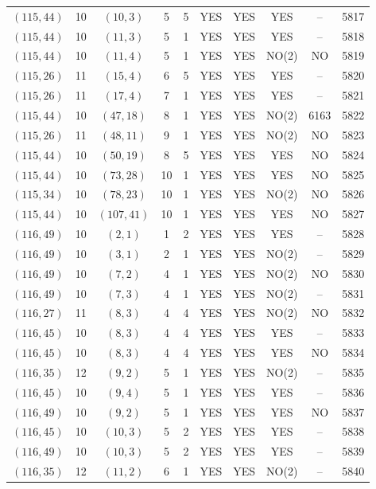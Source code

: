 \begin{longtable}{|c|c|c|c|c|c|c|c|c|c|}
$(115, 44)$ & 10 & $(10, 3)$ & 5 & 5 & YES & YES & YES & -- & 5817\\
$(115, 44)$ & 10 & $(11, 3)$ & 5 & 1 & YES & YES & YES & -- & 5818\\
$(115, 44)$ & 10 & $(11, 4)$ & 5 & 1 & YES & YES & NO(2) & NO & 5819\\
$(115, 26)$ & 11 & $(15, 4)$ & 6 & 5 & YES & YES & YES & -- & 5820\\
$(115, 26)$ & 11 & $(17, 4)$ & 7 & 1 & YES & YES & YES & -- & 5821\\
$(115, 44)$ & 10 & $(47, 18)$ & 8 & 1 & YES & YES & NO(2) & 6163 & 5822\\
$(115, 26)$ & 11 & $(48, 11)$ & 9 & 1 & YES & YES & NO(2) & NO & 5823\\
$(115, 44)$ & 10 & $(50, 19)$ & 8 & 5 & YES & YES & YES & NO & 5824\\
$(115, 44)$ & 10 & $(73, 28)$ & 10 & 1 & YES & YES & YES & NO & 5825\\
$(115, 34)$ & 10 & $(78, 23)$ & 10 & 1 & YES & YES & NO(2) & NO & 5826\\
$(115, 44)$ & 10 & $(107, 41)$ & 10 & 1 & YES & YES & YES & NO & 5827\\
$(116, 49)$ & 10 & $(2, 1)$ & 1 & 2 & YES & YES & YES & -- & 5828\\
$(116, 49)$ & 10 & $(3, 1)$ & 2 & 1 & YES & YES & NO(2) & -- & 5829\\
$(116, 49)$ & 10 & $(7, 2)$ & 4 & 1 & YES & YES & NO(2) & NO & 5830\\
$(116, 49)$ & 10 & $(7, 3)$ & 4 & 1 & YES & YES & NO(2) & -- & 5831\\
$(116, 27)$ & 11 & $(8, 3)$ & 4 & 4 & YES & YES & NO(2) & NO & 5832\\
$(116, 45)$ & 10 & $(8, 3)$ & 4 & 4 & YES & YES & YES & -- & 5833\\
$(116, 45)$ & 10 & $(8, 3)$ & 4 & 4 & YES & YES & YES & NO & 5834\\
$(116, 35)$ & 12 & $(9, 2)$ & 5 & 1 & YES & YES & NO(2) & -- & 5835\\
$(116, 45)$ & 10 & $(9, 4)$ & 5 & 1 & YES & YES & YES & -- & 5836\\
$(116, 49)$ & 10 & $(9, 2)$ & 5 & 1 & YES & YES & YES & NO & 5837\\
$(116, 45)$ & 10 & $(10, 3)$ & 5 & 2 & YES & YES & YES & -- & 5838\\
$(116, 49)$ & 10 & $(10, 3)$ & 5 & 2 & YES & YES & YES & -- & 5839\\
$(116, 35)$ & 12 & $(11, 2)$ & 6 & 1 & YES & YES & NO(2) & -- & 5840\\

\end{longtable}
